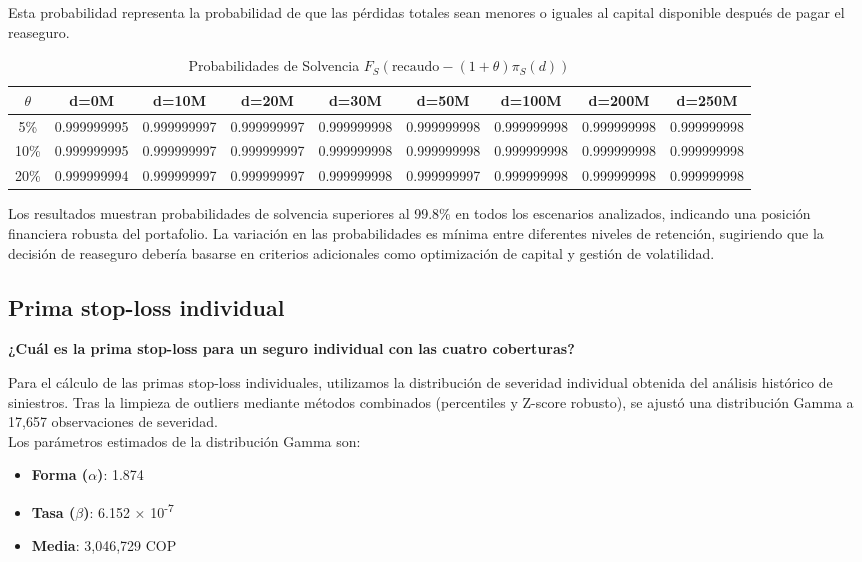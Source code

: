 Esta probabilidad representa la probabilidad de que las pérdidas totales sean menores o iguales al capital disponible después de pagar el reaseguro.

\begin{table}[H]
\centering
\caption{Probabilidades de Solvencia $F_S(\text{recaudo} - (1+\theta)\pi_S(d))$}
\scriptsize
\begin{tabular}{ccccccccc}
\hline
\textbf{$\theta$} & \textbf{d=0M} & \textbf{d=10M} & \textbf{d=20M} & \textbf{d=30M} & \textbf{d=50M} & \textbf{d=100M} & \textbf{d=200M} & \textbf{d=250M} \\
\hline
5\% & 0.999999995 & 0.999999997 & 0.999999997 & 0.999999998 & 0.999999998 & 0.999999998 & 0.999999998 & 0.999999998 \\
10\% & 0.999999995 & 0.999999997 & 0.999999997 & 0.999999998 & 0.999999998 & 0.999999998 & 0.999999998 & 0.999999998 \\
20\% & 0.999999994 & 0.999999997 & 0.999999997 & 0.999999998 & 0.999999997 & 0.999999998 & 0.999999998 & 0.999999998 \\
\hline
\end{tabular}
\end{table}

Los resultados muestran probabilidades de solvencia superiores al 99.8\% en todos los escenarios analizados, indicando una posición financiera robusta del portafolio. La variación en las probabilidades es mínima entre diferentes niveles de retención, sugiriendo que la decisión de reaseguro debería basarse en criterios adicionales como optimización de capital y gestión de volatilidad.

\subsection{Prima stop-loss individual}

\textbf{¿Cuál es la prima stop-loss para un seguro individual con las cuatro coberturas?}

Para el cálculo de las primas stop-loss individuales, utilizamos la distribución de severidad individual obtenida del análisis histórico de siniestros. Tras la limpieza de outliers mediante métodos combinados (percentiles y Z-score robusto), se ajustó una distribución Gamma a 17,657 observaciones de severidad.\\

Los parámetros estimados de la distribución Gamma son:
\begin{itemize}
\item \textbf{Forma ($\alpha$)}: 1.874
\item \textbf{Tasa ($\beta$)}: 6.152 × 10\textsuperscript{-7}
\item \textbf{Media}: 3,046,729 COP
\end{itemize}

